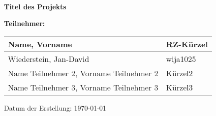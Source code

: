 \documentclass[a4paper, 12pt]{article}
\begin{document}
\begin{titlepage}
    \centering
    
    \vspace*{4cm} %
    
    {\fontsize{24pt}{30pt}\selectfont \textbf{Titel des Projekts}}\par\vspace{1cm}
    
    \hrulefill\par\vspace{0.5cm}
    
    {\Large \textbf{Teilnehmer:}}\par\vspace{0.5cm}
    
    \begin{tabular}{ll}
        Name, Vorname & RZ-Kürzel \\
        \hline
        Wiederstein, Jan-David & wija1025 \\
        Name Teilnehmer 2, Vorname Teilnehmer 2 & Kürzel2 \\
        Name Teilnehmer 3, Vorname Teilnehmer 3 & Kürzel3 \\
    \end{tabular}\par\vspace{1cm}
    
    \hrulefill\par\vspace{1cm}
    
    {\large Datum der Erstellung: \today}\par
    
    
\end{titlepage}
\end{document}
